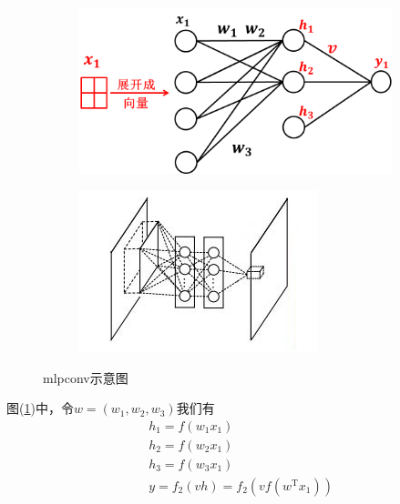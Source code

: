             \begin{figure}[H]
                \centering
                \begin{subfigure}[b]{0.4\textwidth}
                    \includegraphics[width=\textwidth]{images/mlpconv1.jpg}
                    \caption{}
                    \label{fig:mlpconv示意图1}
                \end{subfigure}
                \begin{subfigure}[b]{0.4\textwidth}
                    \includegraphics[width=\textwidth]{images/mlpconv2.jpg}
                    \caption{}
                    \label{fig:mlpconv示意图2}
                \end{subfigure}
                \caption{mlpconv示意图}\label{fig:mlpconv示意图}
            \end{figure}
            图(\ref{fig:mlpconv示意图1})中，令$w = (w_1,w_2,w_3)$我们有
            \begin{align*}
            & h_1 = f(w_1x_1)\\
            & h_2 = f(w_2x_1)\\
            & h_3=f(w_3x_1)\\
            & y=f_2(vh) = f_2(vf(w^\mathrm{T}x_1))
            \end{align*}
